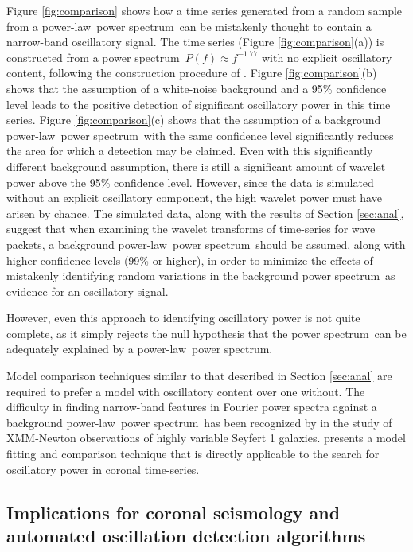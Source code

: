 \documentclass{aastex}
\newcommand{\PS}{power spectrum}
\newcommand{\PL}{power-law}
\begin{document}
Figure \ref{fig:comparison} shows how a time series generated from a
random sample from a \PL\ \PS\ can be mistakenly thought to contain a
narrow-band oscillatory signal.  The time series (Figure
\ref{fig:comparison}(a)) is constructed from a \PS\ $P(f)\approx
f^{-1.77}$ with no explicit oscillatory content, following the
construction procedure of \cite{2010MNRAS.402..307V}.  Figure
\ref{fig:comparison}(b) shows that the assumption of a white-noise
background and a 95\% confidence level leads to the positive detection
of significant oscillatory power in this time series. Figure
\ref{fig:comparison}(c) shows that the assumption of a background
\PL\ \PS\ with the same confidence level significantly reduces the
area for which a detection may be claimed.  Even with this
significantly different background assumption, there is still a
significant amount of wavelet power above the 95\% confidence level.
However, since the data is simulated without an explicit oscillatory
component, the high wavelet power must have arisen by chance.  The
simulated data, along with the results of Section \ref{sec:anal},
suggest that when examining the wavelet transforms of time-series for
wave packets, a background \PL\ \PS\ should be assumed, along with
higher confidence levels (99\% or higher), in order to minimize the
effects of mistakenly identifying random variations in the background
\PS\ as evidence for an oscillatory signal.

However, even this approach to identifying oscillatory power is not
quite complete, as it simply rejects the null hypothesis that the
\PS\ can be adequately explained by a \PL\ \PS.

Model comparison techniques similar to that described in Section
\ref{sec:anal} are required to prefer a model with oscillatory content
over one without. The difficulty in finding narrow-band features in
Fourier power spectra against a background \PL\ \PS\ has been
recognized by \cite{2010MNRAS.402..307V} in the study of XMM-Newton
observations of highly variable Seyfert 1 galaxies.
\cite{2010MNRAS.402..307V} presents a model fitting and comparison
technique that is directly applicable to the search for oscillatory
power in coronal time-series.

\subsection{Implications for coronal seismology and automated
  oscillation detection algorithms}\label{sec:oscdetect}
\end{document}
